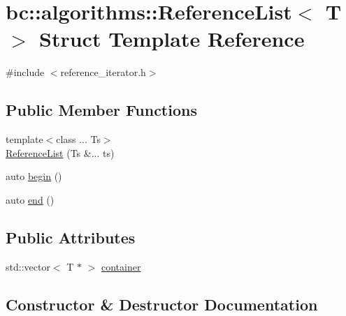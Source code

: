 \hypertarget{structbc_1_1algorithms_1_1ReferenceList}{}\section{bc\+:\+:algorithms\+:\+:Reference\+List$<$ T $>$ Struct Template Reference}
\label{structbc_1_1algorithms_1_1ReferenceList}


{\ttfamily \#include $<$reference\+\_\+iterator.\+h$>$}

\subsection*{Public Member Functions}
\begin{DoxyCompactItemize}
\item 
{\footnotesize template$<$class ... Ts$>$ }\\\hyperlink{structbc_1_1algorithms_1_1ReferenceList_af8ccce0f81c3af9562798bf67c0b7a3e}{Reference\+List} (Ts \&... ts)
\item 
auto \hyperlink{structbc_1_1algorithms_1_1ReferenceList_af26b51906d89718a1b0056bb48788df9}{begin} ()
\item 
auto \hyperlink{structbc_1_1algorithms_1_1ReferenceList_a4ab96a5c41b1f87ae3945b59bb6a2268}{end} ()
\end{DoxyCompactItemize}
\subsection*{Public Attributes}
\begin{DoxyCompactItemize}
\item 
std\+::vector$<$ T $\ast$ $>$ \hyperlink{structbc_1_1algorithms_1_1ReferenceList_a3928763c926758f082377b61aa7d8c32}{container}
\end{DoxyCompactItemize}


\subsection{Constructor \& Destructor Documentation}
\mbox{\label{structbc_1_1algorithms_1_1ReferenceList_af8ccce0f81c3af9562798bf67c0b7a3e}} 
